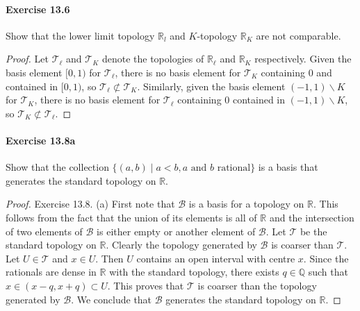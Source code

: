 \documentclass{article}
\begin{document}
\paragraph{Exercise 13.6} Show that the lower limit topology $\mathbb{R}_l$ and $K$-topology $\mathbb{R}_K$ are not comparable.
\begin{proof}
    Let $\mathcal{T}_{\ell}$ and $\mathcal{T}_K$ denote the topologies of $\mathbb{R}_{\ell}$ and $\mathbb{R}_K$ respectively. Given the basis element $[0,1)$ for $\mathcal{T}_{\ell}$, there is no basis element for $\mathcal{T}_K$ containing 0 and contained in $[0,1)$, so $\mathcal{T}_{\ell} \not \subset \mathcal{T}_K$. Similarly, given the basis element $(-1,1) \backslash K$ for $\mathcal{T}_K$, there is no basis element for $\mathcal{T}_{\ell}$ containing 0 contained in $(-1,1) \backslash K$, so $\mathcal{T}_K \not \subset \mathcal{T}_{\ell}$.
\end{proof}



\paragraph{Exercise 13.8a} Show that the collection $\{(a,b) \mid a < b, a \text{ and } b \text{ rational}\}$ is a basis that generates the standard topology on $\mathbb{R}$.
\begin{proof}
    Exercise 13.8. (a) First note that $\mathcal{B}$ is a basis for a topology on $\mathbb{R}$. This follows from the fact that the union of its elements is all of $\mathbb{R}$ and the intersection of two elements of $\mathcal{B}$ is either empty or another element of $\mathcal{B}$. Let $\mathcal{T}$ be the standard topology on $\mathbb{R}$. Clearly the topology generated by $\mathcal{B}$ is coarser than $\mathcal{T}$. Let $U \in \mathcal{T}$ and $x \in U$. Then $U$ contains an open interval with centre $x$. Since the rationals are dense in $\mathbb{R}$ with the standard topology, there exists $q \in \mathbb{Q}$ such that $x \in(x-q, x+q) \subset U$. This proves that $\mathcal{T}$ is coarser than the topology generated by $\mathcal{B}$. We conclude that $\mathcal{B}$ generates the standard topology on $\mathbb{R}$.
\end{proof}
\end{document}

